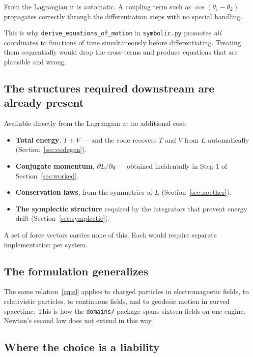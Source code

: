 \documentclass[11pt,a4paper]{article}
\newcommand{\code}[1]{\texttt{#1}}
\begin{document}
From the Lagrangian it is automatic. A coupling term such as $\cos(\theta_1 - \theta_2)$ propagates
correctly through the differentiation steps with no special handling.

This is why \code{derive\_equations\_of\_motion} in \code{symbolic.py} promotes \emph{all}
coordinates to functions of time simultaneously before differentiating. Treating them sequentially
would drop the cross-terms and produce equations that are plausible and wrong.

\subsection{The structures required downstream are already present}

Available directly from the Lagrangian at no additional cost:

\begin{itemize}[leftmargin=1.4em,itemsep=0.25em]
  \item \textbf{Total energy}, $T + V$ --- and the code recovers $T$ and $V$ from $L$ automatically
        (Section~\ref{sec:codegen}).
  \item \textbf{Conjugate momentum}, $\partial L/\partial\dot q$ --- obtained incidentally in Step 1
        of Section~\ref{sec:worked}.
  \item \textbf{Conservation laws}, from the symmetries of $L$ (Section~\ref{sec:noether}).
  \item \textbf{The symplectic structure} required by the integrators that prevent energy drift
        (Section~\ref{sec:symplectic}).
\end{itemize}

A set of force vectors carries none of this. Each would require separate implementation per system.

\subsection{The formulation generalizes}

The same relation~\eqref{eq:el} applies to charged particles in electromagnetic fields, to
relativistic particles, to continuous fields, and to geodesic motion in curved spacetime. This is how
the \code{domains/} package spans sixteen fields on one engine. Newton's second law does not extend
in this way.

\subsection{Where the choice is a liability}
\end{document}
